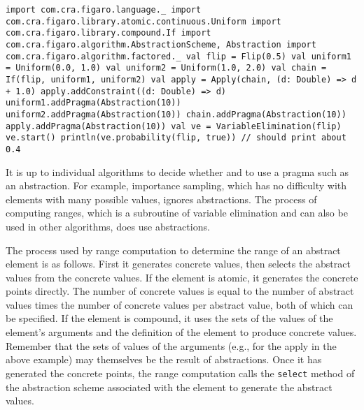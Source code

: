 \begin{flushleft}
\texttt{import com.cra.figaro.language.\_
\newline import com.cra.figaro.library.atomic.continuous.Uniform
\newline import com.cra.figaro.library.compound.If
\newline import com.cra.figaro.algorithm.{AbstractionScheme, Abstraction}
\newline import com.cra.figaro.algorithm.factored.\_
\newline 
\newline val flip = Flip(0.5)
\newline val uniform1 = Uniform(0.0, 1.0)
\newline val uniform2 = Uniform(1.0, 2.0)
\newline val chain = If(flip, uniform1, uniform2)
\newline val apply = Apply(chain, (d: Double) => d + 1.0)
\newline apply.addConstraint((d: Double) => d)
\newline 
\newline uniform1.addPragma(Abstraction(10)) 
\newline uniform2.addPragma(Abstraction(10)) 
\newline chain.addPragma(Abstraction(10)) 
\newline apply.addPragma(Abstraction(10))
\newline 
\newline val ve = VariableElimination(flip)
\newline ve.start()
\newline println(ve.probability(flip, true)) 
\newline // should print about 0.4 }
\end{flushleft}

It is up to individual algorithms to decide whether and to use a pragma such as an abstraction. For example, importance sampling, which has no difficulty with elements with many possible values, ignores abstractions. The process of computing ranges, which is a subroutine of variable elimination and can also be used in other algorithms, does use abstractions.

The process used by range computation to determine the range of an abstract element is as follows. First it generates concrete values, then selects the abstract values from the concrete values. If the element is atomic, it generates the concrete points directly. The number of concrete values is equal to the number of abstract values times the number of concrete values per abstract value, both of which can be specified. If the element is compound, it uses the sets of the values of the element's arguments and the definition of the element to produce concrete values. Remember that the sets of values of the arguments (e.g., for the apply in the above example) may themselves be the result of abstractions. Once it has generated the concrete points, the range computation calls the \texttt{select} method of the abstraction scheme associated with the element to generate the abstract values.

